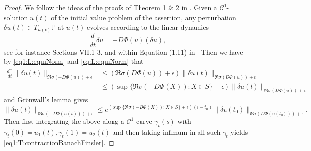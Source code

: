 \documentclass[12pt,reqno]{amsart}
\begin{document}
\begin{proof}
We follow the ideas of the proofs of Theorem 1 \& 2 in \cite{SrinivasanSlotine}. Given a $\mathcal{C}^1$-solution $u(t)$ of the initial value problem of the assertion, any perturbation $\delta u(t)\in T_{u(t)}\mathbb{P}$ at $u(t)$ evolves according to the linear dynamics
\begin{equation*}
\frac{d}{dt}\delta u= -D\Phi(u)(\delta u),
\end{equation*}
see for instance Sections VII.1-3. and within Equation (1.11) in \cite{DaleckiiKrein}. Then we have by \eqref{eq1:L:equiNorm} and \eqref{eq:L:equiNorm} that
\begin{equation*}
\begin{split}
\frac{d^+}{dt}\|\delta u(t)\|_{\Re\sigma(-D\Phi(u))+\epsilon}&\leq (\Re\sigma(D\Phi(u))+\epsilon)\|\delta u(t)\|_{\Re\sigma(D\Phi(u))+\epsilon}\\
&\leq (\sup\{\Re\sigma(-D\Phi(X)):X\in S\}+\epsilon)\|\delta u(t)\|_{\Re\sigma(D\Phi(u))+\epsilon}
\end{split}
\end{equation*}
and Gr\" onwall's lemma gives
\begin{equation*}
\|\delta u(t)\|_{\Re\sigma(-D\Phi(u(t)))+\epsilon}\leq e^{(\sup\{\Re\sigma(-D\Phi(X)):X\in S\}+\epsilon)(t-t_0)}\|\delta u(t_0)\|_{\Re\sigma(D\Phi(u(t_0)))+\epsilon}.
\end{equation*}
Then first integrating the above along a $\mathcal{C}^1$-curve $\gamma_t(s)$ with $\gamma_t(0)=u_1(t), \gamma_t(1)=u_2(t)$ and then taking infimum in all such $\gamma_t$ yields \eqref{eq1:T:contractionBanachFinsler}.
\end{proof}
\end{document}
